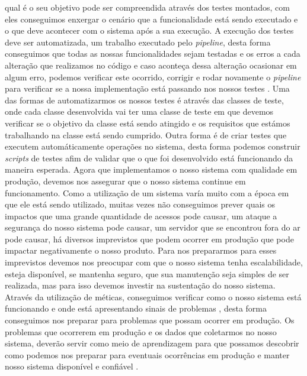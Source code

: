     qual é o seu objetivo pode ser compreendida através dos testes montados, com
    eles conseguimos enxergar o cenário que a funcionalidade está sendo executado
    e o que deve acontecer com o sistema após a sua execução. \newline
    A execução dos testes deve ser automatizada, um trabalho executado pelo
    \textit{pipeline}, desta forma conseguimos que todas as nossas funcionalidades
    sejam testadas e os erros a cada alteração que realizamos no código e caso
    aconteça dessa alteração ocasionar em algum erro, podemos verificar este
    ocorrido, corrigir e rodar novamente o \textit{pipeline} para verificar se
    a nossa implementação está passando nos nossos testes \cite{ContinuousDelivery}.
    Uma das formas de automatizarmos os nossos testes é através das classes de
    teste, onde cada classe desenvolvida vai ter uma classe de teste em que
    devemos verificar se o objetivo da classe está sendo atingido e os requisitos
    que estámos trabalhando na classe está sendo cumprido. Outra forma é de criar
    testes que executem automáticamente operações no sistema, desta forma podemos
    construir \textit{scripts} de testes afim de validar que o que foi desenvolvido
    está funcionando da maneira esperada. \newline
    Agora que implementamos o nosso sistema com qualidade em produção, devemos
    nos assegurar que o nosso sistema continue em funcionamento. Como a utilização
    de um sistema varía muito com a época em que ele está sendo utilizado, muitas
    vezes não conseguimos prever quais os impactos que uma grande quantidade de
    acessos pode causar, um ataque a segurança do nosso sistema pode causar,
    um servidor que se encontrou fora do ar pode causar, há diversos imprevistos
    que podem ocorrer em produção que pode impactar negativamente o nosso
    produto. \newline
    Para nos prepararmos para esses imprevistos devemos nos preocupar com que
    o nosso sistema tenha escalabilidade, esteja disponível, se mantenha
    seguro, que sua manutenção seja simples de ser realizada, mas para isso
    devemos investir na sustentação do nosso sistema. Através da utilização
    de méticas, conseguimos verificar como o nosso sistema está funcionando e
    onde está apresentando sinais de problemas \cite{TheDevOpsHandbook}, desta
    forma conseguimos nos preparar para problemas que possam ocorrer em produção.
    Os problemas que ocorrerem em produção e os dados que coletarmos no nosso
    sistema, deverão servir como meio de aprendizagem para que possamos descobrir
    como podemos nos preparar para eventuais ocorrências em produção e manter
    nosso sistema disponível e confiável \cite{SiteReliabilityEngineering}.
